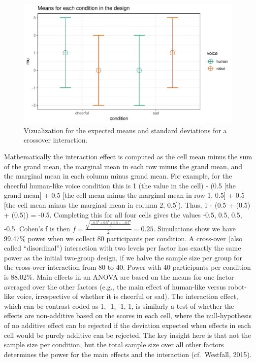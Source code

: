 \documentclass[,jou, draftfirst, a4paper,floatsintext]{apa6}
\begin{document}
\begin{figure}
\centering
\includegraphics{0.1_Simulation_Based_Power_Analysis_For_Factorial_ANOVA_Designs_files/figure-latex/mean-plot-1.pdf}
\caption{\label{fig:mean-plot}Vizualization for the expected means and standard deviations for a crossover interaction.}
\end{figure}

Mathematically the interaction effect is computed as the cell mean minus the sum of the grand mean, the marginal mean in each row minus the grand mean, and the marginal mean in each column minus grand mean. For example, for the cheerful human-like voice condition this is 1 (the value in the cell) - (0.5 {[}the grand mean{]} + 0.5 {[}the cell mean minus the marginal mean in row 1, 0.5{]} + 0.5 {[}the cell mean minus the marginal mean in column 2, 0.5{]}).
Thus, 1 - (0.5 + (0.5) + (0.5)) = -0.5.
Completing this for all four cells gives the values -0.5, 0.5, 0.5, -0.5.
Cohen's f is then \(f = \frac { \sqrt { \frac { -0.5^2 + 0.5^2 + 0.5 + -0.5^2 } { 4 } }}{ 2 } = 0.25\).
Simulations show we have 99.47\% power when we collect 80 participants per condition.
A cross-over (also called \enquote{disordinal}) interaction with two levels per factor has exactly the same power as the initial two-group design, if we halve the sample size per group for the cross-over interaction from 80 to 40.
Power with 40 participants per condition is 88.02\%.
Main effects in an ANOVA are based on the means for one factor averaged over the other factors (e.g., the main effect of human-like versus robot-like voice, irrespective of whether it is cheerful or sad).
The interaction effect, which can be contrast coded as 1, -1, -1, 1, is similarly a test of whether the effects are non-additive based on the scores in each cell, where the null-hypothesis of no additive effect can be rejected if the deviation expected when effects in each cell would be purely additive can be rejected.
The key insight here is that not the sample size per condition, but the total sample size over all other factors determines the power for the main effects and the interaction (cf.~Westfall, 2015).
\end{document}
